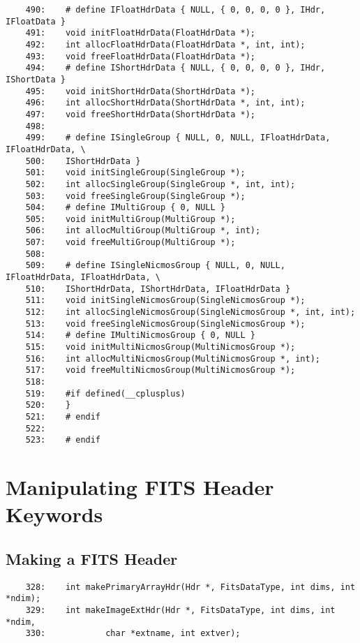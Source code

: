 \begin{scriptsize}
\begin{verbatim}
    490:    # define IFloatHdrData { NULL, { 0, 0, 0, 0 }, IHdr, IFloatData }
    491:    void initFloatHdrData(FloatHdrData *);
    492:    int allocFloatHdrData(FloatHdrData *, int, int);
    493:    void freeFloatHdrData(FloatHdrData *);
    494:    # define IShortHdrData { NULL, { 0, 0, 0, 0 }, IHdr, IShortData }
    495:    void initShortHdrData(ShortHdrData *);
    496:    int allocShortHdrData(ShortHdrData *, int, int);
    497:    void freeShortHdrData(ShortHdrData *);
    498:    
    499:    # define ISingleGroup { NULL, 0, NULL, IFloatHdrData, IFloatHdrData, \
    500:    IShortHdrData }
    501:    void initSingleGroup(SingleGroup *);
    502:    int allocSingleGroup(SingleGroup *, int, int);
    503:    void freeSingleGroup(SingleGroup *);
    504:    # define IMultiGroup { 0, NULL }
    505:    void initMultiGroup(MultiGroup *);
    506:    int allocMultiGroup(MultiGroup *, int);
    507:    void freeMultiGroup(MultiGroup *);
    508:    
    509:    # define ISingleNicmosGroup { NULL, 0, NULL, IFloatHdrData, IFloatHdrData, \
    510:    IShortHdrData, IShortHdrData, IFloatHdrData }
    511:    void initSingleNicmosGroup(SingleNicmosGroup *);
    512:    int allocSingleNicmosGroup(SingleNicmosGroup *, int, int);
    513:    void freeSingleNicmosGroup(SingleNicmosGroup *);
    514:    # define IMultiNicmosGroup { 0, NULL }
    515:    void initMultiNicmosGroup(MultiNicmosGroup *);
    516:    int allocMultiNicmosGroup(MultiNicmosGroup *, int);
    517:    void freeMultiNicmosGroup(MultiNicmosGroup *);
    518:    
    519:    #if defined(__cplusplus)
    520:    }
    521:    # endif
    522:    
    523:    # endif
\end{verbatim}
\end{scriptsize}

\section {
Manipulating FITS Header Keywords
}

\subsection{ Making a FITS Header }

\begin{scriptsize}
\begin{verbatim}
    328:    int makePrimaryArrayHdr(Hdr *, FitsDataType, int dims, int *ndim);
    329:    int makeImageExtHdr(Hdr *, FitsDataType, int dims, int *ndim, 
    330:            char *extname, int extver);
\end{verbatim}
\end{scriptsize}

